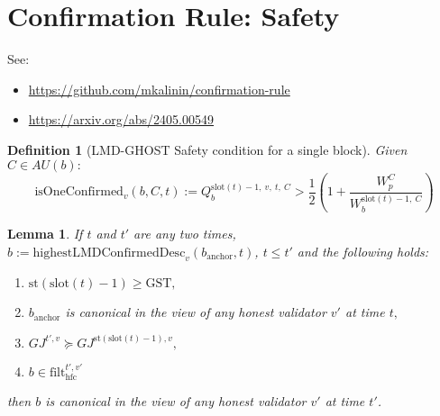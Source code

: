 \documentclass{article}
\newtheorem{lemma}{Lemma}
\newtheorem{definition}{Definition}
\begin{document}
\section*{Confirmation Rule: Safety}

See:
\begin{itemize}
    \item \href{https://github.com/mkalinin/confirmation-rule}{https://github.com/mkalinin/confirmation-rule}
    \item \href{https://arxiv.org/abs/2405.00549}{https://arxiv.org/abs/2405.00549}
\end{itemize}

\begin{definition}[LMD-GHOST Safety condition for a single block]
    Given $C \in AU(b):$
    \[
    \text{isOneConfirmed}_v(b, C, t) := Q^{\text{slot}(t)-1,\ v,\ t,\ C}_{b} > \frac{1}{2}\left(1 + \frac{W^C_p}{W^{\text{slot}(t)-1,\ C}_b}\right)
    \]
\end{definition}


\begin{algorithm}[H]
\caption{Highest LMD-GHOST confirmed descendant}
\SetAlgoNoLine
{}
\end{algorithm}


\begin{lemma}
If $t$ and $t'$ are any two times, $b := \text{highestLMDConfirmedDesc}_v(b_{\text{anchor}}, t)$, $t \leq t'$ and the following holds:
\begin{enumerate}
    \item $\text{st}(\text{slot}(t) - 1) \geq \text{GST},$
    \item $b_{\text{anchor}}$ is canonical in the view of any honest validator $v'$ at time $t,$
    \item $GJ^{t',v} \succeq GJ^{\text{st}(\text{slot}(t) - 1),v},$
    \item $b \in \text{filt}^{t',v'}_{\text{hfc}}$
\end{enumerate}

then $b$ is canonical in the view of any honest validator $v'$ at time $t'$.
\end{lemma}
\end{document}

